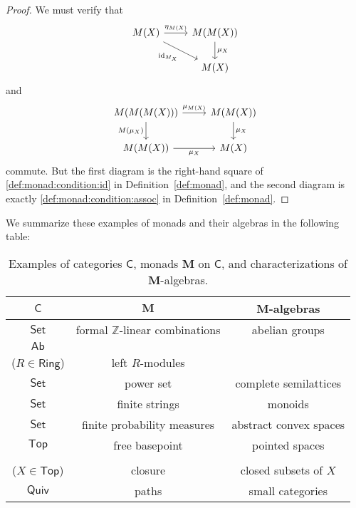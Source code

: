 \documentclass{article}
\theoremstyle{definition}
\newcommand{\C}{\mathsf{C}}
\newcommand{\M}{\mathbf{M}}
\newcommand{\ZZ}{\mathbb{Z}}
\DeclareMathOperator{\id}{id}
\begin{document}
\begin{proof}
    We must verify that
    \[\begin{tikzcd}[ampersand replacement=\&]
    	M(X) \& {M(M(X))} \\
    	\& M(X)
    	\arrow["{\eta_{M(X)}}", from=1-1, to=1-2]
    	\arrow["\mu_X", from=1-2, to=2-2]
    	\arrow["\id_{M_X}"', from=1-1, to=2-2]
    \end{tikzcd}\]
    and
    \[\begin{tikzcd}[ampersand replacement=\&]
    	{M(M(M(X)))} \& {M(M(X))} \\
    	{M(M(X))} \& M(X)
    	\arrow["{\mu_{M(X)}}", from=1-1, to=1-2]
    	\arrow["\mu_X", from=1-2, to=2-2]
    	\arrow["{M(\mu_X)}"', from=1-1, to=2-1]
    	\arrow["\mu_X"', from=2-1, to=2-2]
    \end{tikzcd}\]
    commute. But the first diagram is the right-hand square of \ref{def:monad:condition:id} in Definition~\ref{def:monad}, and the second diagram is exactly \ref{def:monad:condition:assoc} in Definition~\ref{def:monad}.
\end{proof}

We summarize these examples of monads and their algebras in the following table:

\begin{table}[h]
    \centering
    \def\arraystretch{1.5}
    \begin{tabular}{c|c|c}
         $\C$ & $\M$ & $\M$-algebras \\ \hline
         $\mathsf{Set}$ & formal $\ZZ$-linear combinations & abelian groups \\
         $\mathsf{Ab}$ & \makecell{$R \otimes {-}$ \\ {\color{gray} ($R \in \mathsf{Ring}$)}}  & left $R$-modules \\
         $\mathsf{Set}$ & power set & complete semilattices \\
         $\mathsf{Set}$ & finite strings & monoids \\
         $\mathsf{Set}$ & finite probability measures & abstract convex spaces \\
         $\mathsf{Top}$ & free basepoint & pointed spaces \\
         \makecell{$\mathcal{P}(X)$ \\ {\color{gray} ($X \in \mathsf{Top}$)}} & closure & closed subsets of $X$ \\
         $\mathsf{Quiv}$ & paths & small categories
    \end{tabular}
    \caption{Examples of categories $\C$, monads $\M$ on $\C$, and characterizations of $\M$-algebras.}
    \label{table:examples:monads-and-algebras}
\end{table}
\end{document}
